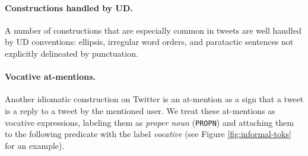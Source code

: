 \documentclass[11pt,a4paper]{article}
\newcommand{\yjcomment}[1]{\textcolor{orange}{[$_\mathrm{L}^\mathrm{Y}$#1]}}
\newcommand{\nascomment}[1]{\textcolor{blue}{[#1 ---\textsc{nas}]}}
\begin{document}


\paragraph{Constructions handled by UD.}  A number of constructions
that are especially common in tweets are well handled by UD
conventions:  ellipsis, irregular word orders, and paratactic sentences
not explicitly delineated by punctuation.
	

\paragraph{Vocative at-mentions.}  Another idiomatic construction on
Twitter is an at-mention %
as a sign that a tweet is a reply to a tweet by the mentioned user.  We
treat these at-mentions as vocative expressions, labeling them as
\emph{proper noun} (\texttt{PROPN}) and attaching them to the
following predicate with the label \emph{vocative} (see Figure \ref{fig:informal-toks} for an example).  
\end{document}
